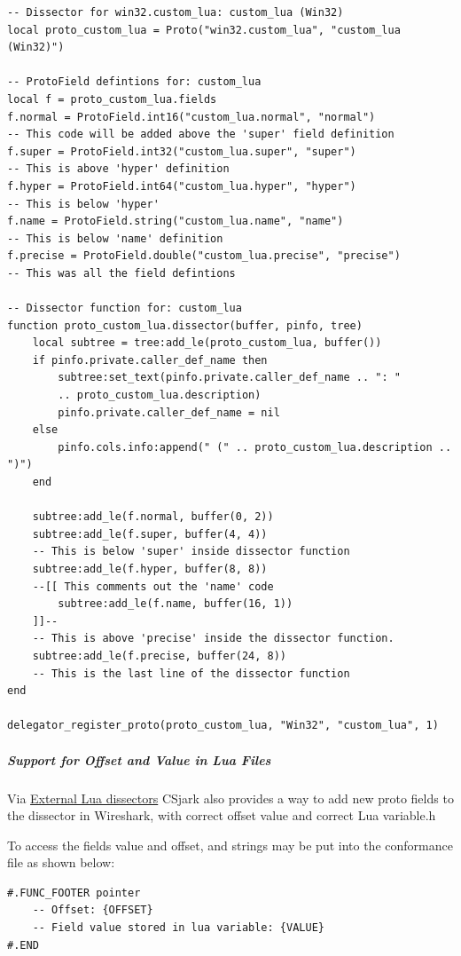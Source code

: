 \documentclass[A4paper,10pt,english]{sphinxmanual}
\begin{document}
\begin{Verbatim}[commandchars=\\\{\}]
-- Dissector for win32.custom_lua: custom_lua (Win32)
local proto_custom_lua = Proto("win32.custom_lua", "custom_lua (Win32)")

-- ProtoField defintions for: custom_lua
local f = proto_custom_lua.fields
f.normal = ProtoField.int16("custom_lua.normal", "normal")
-- This code will be added above the 'super' field definition
f.super = ProtoField.int32("custom_lua.super", "super")
-- This is above 'hyper' definition
f.hyper = ProtoField.int64("custom_lua.hyper", "hyper")
-- This is below 'hyper'
f.name = ProtoField.string("custom_lua.name", "name")
-- This is below 'name' definition
f.precise = ProtoField.double("custom_lua.precise", "precise")
-- This was all the field defintions

-- Dissector function for: custom_lua
function proto_custom_lua.dissector(buffer, pinfo, tree)
    local subtree = tree:add_le(proto_custom_lua, buffer())
    if pinfo.private.caller_def_name then
        subtree:set_text(pinfo.private.caller_def_name .. ": " 
        .. proto_custom_lua.description)
        pinfo.private.caller_def_name = nil
    else
        pinfo.cols.info:append(" (" .. proto_custom_lua.description .. ")")
    end

    subtree:add_le(f.normal, buffer(0, 2))
    subtree:add_le(f.super, buffer(4, 4))
    -- This is below 'super' inside dissector function
    subtree:add_le(f.hyper, buffer(8, 8))
    --[[ This comments out the 'name' code
        subtree:add_le(f.name, buffer(16, 1))
    ]]--
    -- This is above 'precise' inside the dissector function.
    subtree:add_le(f.precise, buffer(24, 8))
    -- This is the last line of the dissector function
end

delegator_register_proto(proto_custom_lua, "Win32", "custom_lua", 1)
\end{Verbatim}


\subparagraph{Support for Offset and Value in Lua Files}
\label{user/config:support-for-offset-and-value-in-lua-files}
Via {\hyperref[user/config:external-lua-dissectors]{External Lua dissectors}} CSjark also provides a way to add new proto fields to the dissector in Wireshark, with correct offset value and correct Lua variable.h

To access the fields value and offset,  and  strings may be put into the conformance file as shown below:

\begin{Verbatim}[commandchars=\\\{\}]
#.FUNC_FOOTER pointer
    -- Offset: {OFFSET}
    -- Field value stored in lua variable: {VALUE}
#.END
\end{Verbatim}
\end{document}
